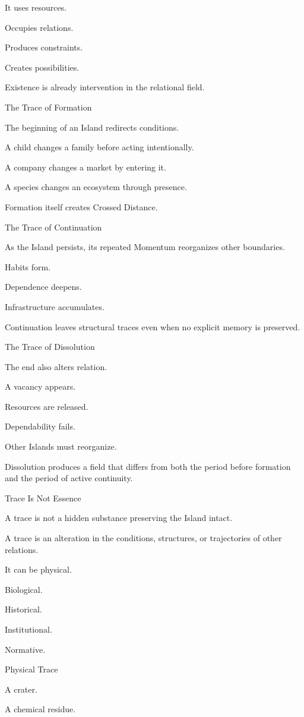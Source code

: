 It uses resources.

Occupies relations.

Produces constraints.

Creates possibilities.

Existence is already intervention in the relational field.

The Trace of Formation

The beginning of an Island redirects conditions.

A child changes a family before acting intentionally.

A company changes a market by entering it.

A species changes an ecosystem through presence.

Formation itself creates Crossed Distance.

The Trace of Continuation

As the Island persists, its repeated Momentum reorganizes other boundaries.

Habits form.

Dependence deepens.

Infrastructure accumulates.

Continuation leaves structural traces even when no explicit memory is preserved.

The Trace of Dissolution

The end also alters relation.

A vacancy appears.

Resources are released.

Dependability fails.

Other Islands must reorganize.

Dissolution produces a field that differs from both the period before formation and the period of active continuity.

Trace Is Not Essence

A trace is not a hidden substance preserving the Island intact.

A trace is an alteration in the conditions, structures, or trajectories of other relations.

It can be physical.

Biological.

Historical.

Institutional.

Normative.

Physical Trace

A crater.

A chemical residue.

